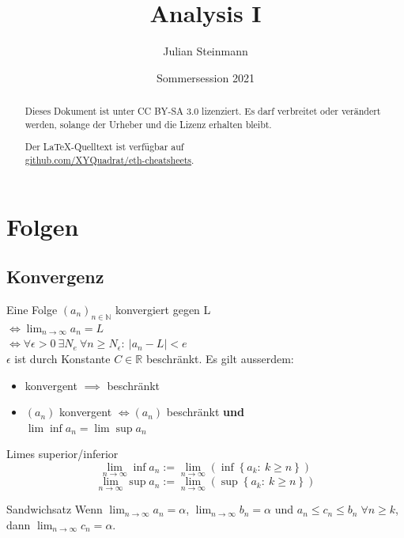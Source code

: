\documentclass[a4paper,10pt]{article}
\title{Analysis I}
\author{Julian Steinmann}
\date{Sommersession 2021}
\def\limn{\lim_{n\to \infty}}
\def\R{\mathbb{R}}
\begin{document}
\maketitle

\renewcommand{\abstractname}{Lizenz}
\begin{abstract}
 Dieses Dokument ist unter CC BY-SA 3.0 lizenziert. Es darf verbreitet oder verändert werden, solange der Urheber und die Lizenz erhalten bleibt. \\

 \begin{center}
 Der \LaTeX-Quelltext ist verfügbar auf \\ \href{https://github.com/XYQuadrat/eth-cheatsheets}{github.com/XYQuadrat/eth-cheatsheets}.
 \end{center}
\end{abstract}

\RaggedRight

\section{Folgen}
\subsection{Konvergenz}
Eine Folge $(a_n)_{n\in \mathbb{N}}$ konvergiert gegen L \\ $\iff \lim_{n \to \infty} a_n = L $ \\ $\iff \forall \epsilon > 0 \ \exists N_e \ \forall n \ge N_\epsilon : \ | a_n - L | < e$\\

$\epsilon$ ist durch Konstante $C \in \R$ beschränkt.
Es gilt ausserdem:
\begin{itemize}
 \item konvergent $\implies$ beschränkt
 \item $(a_n)$ konvergent $\iff (a_n)$ beschränkt \textbf{und} \\$\lim \inf a_n = \lim \sup a_n$
\end{itemize}


\begin{subbox}{Limes superior/inferior}
\[ \limn \inf a_n := \limn \left( \inf \left\{ a_k : \: k \geq n \right\} \right) \]
\[ \limn \sup a_n := \limn \left( \sup \left\{ a_k : \: k \geq n \right\} \right) \]
\end{subbox}

\begin{subbox}{Sandwichsatz}
Wenn $\limn a_n = \alpha$, $\limn b_n = \alpha$ und $a_n \le c_n \le b_n \; \forall n \ge k$, dann $\limn c_n = \alpha$.
\end{subbox}
\end{document}
